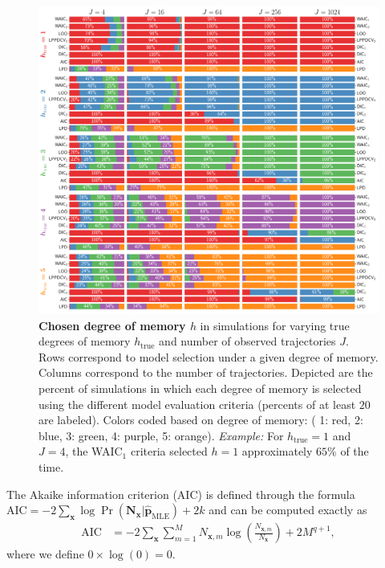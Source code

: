 \documentclass{IOS-Book-Article}
\newcommand{\bN}{\mathbf{N}}
\newcommand{\bx}{\mathbf{x}}
\newcommand{\bp}{\mathbf{p}}
\begin{document}
\begin{figure}[!ht]
\includegraphics[width=\textwidth]{fig2}
\caption{\textbf{Chosen degree of memory $h$} in simulations for varying true degrees of memory  $h_{\textrm{true}}$ and number of observed trajectories $J$. Rows correspond to model selection under a given degree of memory. Columns correspond to the number of trajectories. Depicted are the percent of simulations in which each degree of memory is selected using the different model evaluation criteria (percents of at least $20$ are labeled). Colors coded based on degree of memory: ({\color{Set1_5_red} 1: red}, {\color{Set1_5_blue} 2: blue}, {\color{Set1_5_green}3: green}, {\color{Set1_5_purple}4: purple}, {\color{Set1_5_orange}5: orange}). \emph{Example:} For $h_{\textrm{true}}=1$ and $J=4$, the WAIC$_1$ criteria selected $h=1$ approximately $65\%$ of the time. }
\label{fig:fig2}
\end{figure}



The Akaike information criterion (AIC) is defined through the formula $\textrm{AIC}  = -2 \sum_{\bx}\log \Pr(\bN_\bx \vert \hat{\bp}_{\textrm{MLE}}) + 2k$ and can be computed exactly as
\begin{align}
\textrm{AIC}  &= -2\sum_{\bx}\sum_{m=1}^M N_{\bx,m}\log \left( \frac{N_{\bx,m}}{N_\bx} \right)+ 2M^{q+1},
\end{align}
where we define $0\times\log(0)=0$.
\end{document}
